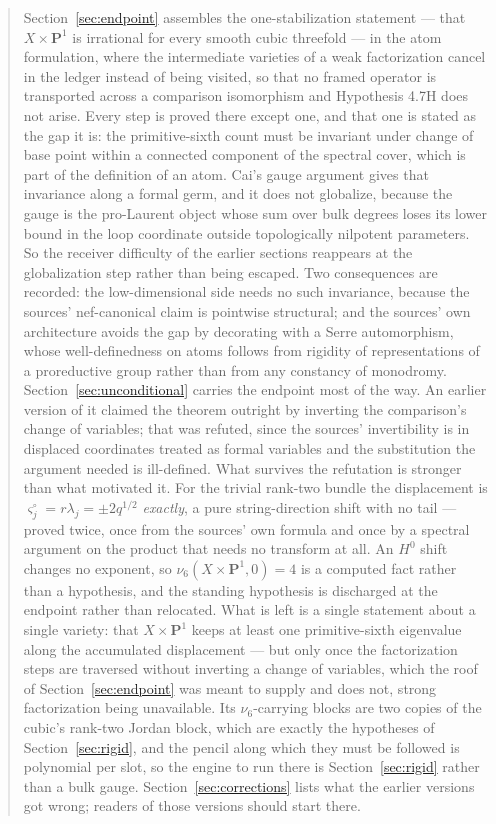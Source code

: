 \documentclass[11pt]{article}
\theoremstyle{definition}
\theoremstyle{remark}
\newcommand{\PP}{\mathbf P}
\begin{document}
\begin{abstract}
Section~\ref{sec:endpoint} assembles the one-stabilization statement --- that
$X\times\PP^1$ is irrational for every smooth cubic threefold --- in the atom
formulation, where the intermediate varieties of a weak factorization cancel in
the ledger instead of being visited, so that no framed operator is transported
across a comparison isomorphism and Hypothesis 4.7H does not arise. Every step
is proved there except one, and that one is stated as the gap it is: the
primitive-sixth count must be invariant under change of base point within a
connected component of the spectral cover, which is part of the definition of an
atom. Cai's gauge argument gives that invariance along a formal germ, and it
does not globalize, because the gauge is the pro-Laurent object whose sum over
bulk degrees loses its lower bound in the loop coordinate outside topologically
nilpotent parameters. So the receiver difficulty of the earlier sections
reappears at the globalization step rather than being escaped. Two consequences
are recorded: the low-dimensional side needs no such invariance, because the
sources' nef-canonical claim is pointwise structural; and the sources' own
architecture avoids the gap by decorating with a Serre automorphism, whose
well-definedness on atoms follows from rigidity of representations of a
proreductive group rather than from any constancy of monodromy.
Section~\ref{sec:unconditional} carries the endpoint most of the way. An
earlier version of it claimed the theorem outright by inverting the comparison's
change of variables; that was refuted, since the sources' invertibility is in
displaced coordinates treated as formal variables and the substitution the
argument needed is ill-defined. What survives the refutation is stronger than
what motivated it. For the trivial rank-two bundle the displacement is
$\varsigma_j^\circ=r\lambda_j=\pm2q^{1/2}$ \emph{exactly}, a pure string-direction
shift with no tail --- proved twice, once from the sources' own formula and once
by a spectral argument on the product that needs no transform at all. An $H^0$
shift changes no exponent, so $\nu_6(X\times\PP^1,0)=4$ is a computed fact rather
than a hypothesis, and the standing hypothesis is discharged at the endpoint
rather than relocated. What is
left is a single statement about a single variety: that $X\times\PP^1$ keeps at
least one primitive-sixth eigenvalue along the accumulated displacement --- but
only once the factorization steps are traversed without inverting a change of
variables, which the roof of Section~\ref{sec:endpoint} was meant to supply and
does not, strong factorization being unavailable. Its
$\nu_6$-carrying blocks are two copies of the cubic's rank-two Jordan block,
which are exactly the hypotheses of Section~\ref{sec:rigid}, and the pencil along
which they must be followed is polynomial per slot, so the engine to run there is
Section~\ref{sec:rigid} rather than a bulk gauge.
Section~\ref{sec:corrections} lists what the earlier versions got wrong;
readers of those versions should start there.
\end{abstract}
\end{document}
